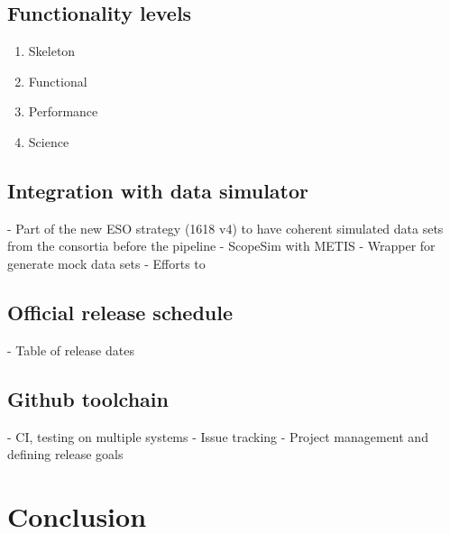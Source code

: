 \documentclass[]{spie}  %
\begin{document}
\subsection{Functionality levels}
\label{ssec:dev_levels}
 
 
 \begin{enumerate}
     \item Skeleton
     \item Functional
     \item Performance
     \item Science
 \end{enumerate}
\subsection{Integration with data simulator}
\label{ssec:dev_scopesim}
	- Part of the new ESO strategy (1618 v4) to have coherent simulated data sets from the consortia before the pipeline 
	- ScopeSim with METIS
	- Wrapper for generate mock data sets
	- Efforts to 
\subsection{Official release schedule}
\label{ssec:dev_releases}
	- Table of release dates
\subsection{Github toolchain}
\label{ssec:dev_testing}
	- CI, testing on multiple systems
	- Issue tracking
	- Project management and defining release goals

\section{Conclusion}
\label{sec:conclusion}






\appendix    %

\acknowledgments %

\end{document}
